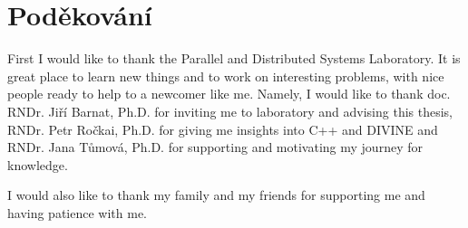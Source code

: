 \documentclass[11pt,twoside,a4paper]{book}
\newcommand{\divine}{\mbox{\textsf{DIVINE}}\xspace}
\newcommand{\Jirik}{doc. RNDr. Jiří Barnat, Ph.D.}
\newcommand{\Mornfall}{RNDr. Petr Ročkai, Ph.D.}
\newcommand{\Jana}{RNDr. Jana Tůmová, Ph.D.}
\begin{document}
\cleardoublepage

\section*{Poděkování}
First I would like to thank the Parallel and Distributed Systems Laboratory.
It is great place to learn new things and to work on interesting problems,
with nice people ready to help to a newcomer like me. Namely, I would like to
thank \Jirik{} for inviting me to laboratory and advising this thesis,
\Mornfall{} for giving me insights into C++ and \divine{} and
\Jana{} for supporting and motivating my journey for knowledge.

I would also like to thank my family and my friends for supporting me and having
patience with me.

\cleardoublepage
\thispagestyle{empty}

\pagestyle{headings}
\tableofcontents %
\mainmatter



%



\end{document}
